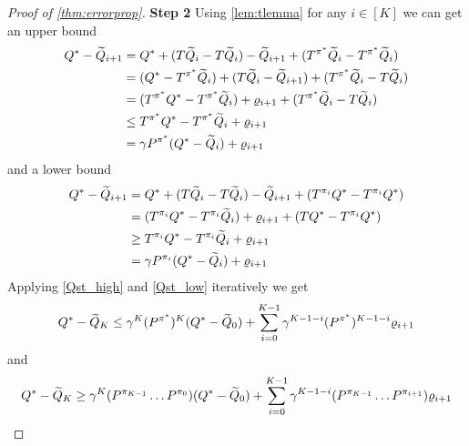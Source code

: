 \begin{proof}[Proof of \cref{thm:errorprop}]
  \textbf{Step 2}
  Using \cref{lem:tlemma} for any $i \in [K]$ we can get an upper bound
  \begin{align}
    Q^* - \widetilde{Q}_{i+1} &= Q^* + (T\widetilde{Q}_i - T \widetilde{Q}_i) - \widetilde{Q}_{i+1}
    + (T^{\pi^*}\widetilde{Q}_i - T^{\pi^*}\widetilde{Q}_i) \notag
    \\ &= (Q^* - T^{\pi^*} \widetilde{Q}_i) + (T \widetilde{Q}_i - \widetilde{Q}_{i+1})
    + (T^{\pi^*}\widetilde{Q}_i - T \widetilde{Q}_i) \notag
    \\ &= (T^{\pi^*} Q^* - T^{\pi^*} \widetilde{Q}_i) + \varrho_{i+1}
    + (T^{\pi^*}\widetilde{Q}_i - T \widetilde{Q}_i) \notag
    \\ &\leq T^{\pi^*} Q^* - T^{\pi^*} \widetilde{Q}_i + \varrho_{i+1} \notag
    \\ &= \gamma P^{\pi^*} (Q^* - \widetilde{Q}_i) + \varrho_{i+1} \label{Qst_high}
  \end{align}
  and a lower bound
  \begin{align}
    Q^* - \widetilde{Q}_{i+1} &= Q^* + (T\widetilde{Q}_i - T \widetilde{Q}_i) - \widetilde{Q}_{i+1}
    + (T^{\pi_i}Q^* - T^{\pi_i}Q^*) \notag
    \\ &= (T^{\pi_i}Q^* - T^{\pi_i} \widetilde{Q}_i) + \varrho_{i+1}
    + (T Q^* - T^{\pi_i} Q^*) \notag
    \\ &\geq T^{\pi_i}Q^* - T^{\pi_i} \widetilde{Q}_i + \varrho_{i+1} \notag
    \\ &= \gamma P^{\pi_i} (Q^* - \widetilde{Q}_i) + \varrho_{i+1} \label{Qst_low}
  \end{align}
  Applying \cref{Qst_high} and \cref{Qst_low} iteratively we get  
  \begin{align}
    Q^* - \widetilde{Q}_K \leq \gamma^K (P^{\pi^*})^K (Q^* - \widetilde{Q}_0)
    + \sum_{i=0}^{K-1} \gamma^{K-1-i} (P^{\pi^*})^{K-1-i} \varrho_{i+1}
    \label{eq:Qsk_high}
  \end{align}
  and
  \begin{align}
    Q^* - \widetilde{Q}_K \geq \gamma^K (P^{\pi_{K-1}} \dots P^{\pi_0})(Q^* - \widetilde{Q}_0)
    + \sum_{i=0}^{K-1}\gamma^{K-1-i}(P^{\pi_{K-1}}\dots P^{\pi_{i+1}})
    \varrho_{i+1} \label{eq:Qsk_low}
  \end{align}


\end{proof}
